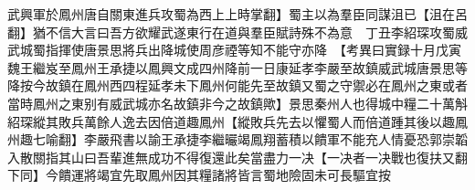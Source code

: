 武興軍於鳳州唐自關東進兵攻蜀為西上上時掌翻】蜀主以為羣臣同謀沮已【沮在呂翻】猶不信大言曰吾方欲耀武遂東行在道與羣臣賦詩殊不為意　丁丑李紹琛攻蜀威武城蜀指揮使唐景思將兵出降城使周彦禋等知不能守亦降　【考異曰實録十月戊寅魏王繼岌至鳳州王承捷以鳳興文成四州降前一日康延孝李嚴至故鎮威武城唐景思等降按今故鎮在鳳州西四程延孝未下鳳州何能先至故鎮又蜀之守禦必在鳳州之東或者當時鳳州之東别有威武城亦名故鎮非今之故鎮歟】景思秦州人也得城中糧二十萬斛紹琛縱其敗兵萬餘人逸去因倍道趣鳳州【縱敗兵先去以懼蜀人而倍道踵其後以趣鳳州趣七喻翻】李嚴飛書以諭王承捷李繼曮竭鳳翔蓄積以饋軍不能充人情憂恐郭崇韜入散關指其山曰吾輩進無成功不得復還此矣當盡力一决【一决者一决戰也復扶又翻下同】今饋運將竭宜先取鳳州因其糧諸將皆言蜀地險固未可長驅宜按